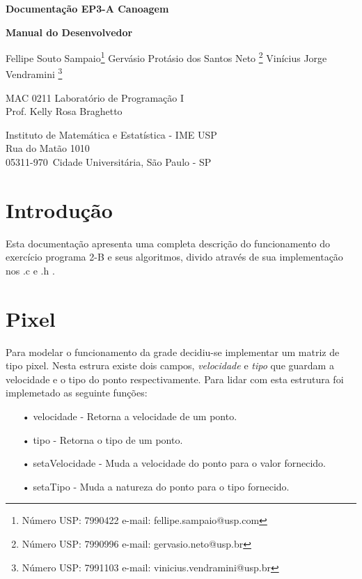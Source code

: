 \documentclass[a4paper,11pt]{article}
\begin{document}
\begin{center}{\Large \bf Documenta\c{c}ão EP3-A Canoagem \\ }\end{center}
\begin{center}{\Large \bf Manual do Desenvolvedor\\ }\end{center}

\begin{center}
{
Fellipe Souto Sampaio\footnote{Número USP: 7990422 e-mail: fellipe.sampaio@usp.com}
Gervásio Protásio dos Santos Neto \footnote{Número USP: 7990996 e-mail: gervasio.neto@usp.br}
Vinícius Jorge Vendramini \footnote{Número USP: 7991103 e-mail: vinicius.vendramini@usp.br}
}

\end{center}

\begin{center}
MAC 0211 Laboratório de Programa\c{c}ão I \\
Prof. Kelly Rosa Braghetto \\
             
\end{center}

\begin{center}
Instituto de Matemática e Estatística - IME USP \\
 Rua do Matão 1010 \\
 05311-970\, Cidade Universitária, São Paulo - SP \\
\end{center}

\newpage

\section{Introdu\c{c}ão}
Esta documenta\c{c}ão apresenta uma completa descri\c{c}ão do funcionamento do exercício programa 2-B e seus algoritmos, divido através de sua implementa\c{c}ão nos .c e .h .

\section{Pixel}
Para modelar o funcionamento da grade decidiu-se implementar um matriz de tipo pixel. Nesta estrura existe dois campos, \textit{velocidade} e \textit{tipo} que guardam a velocidade e o tipo do ponto respectivamente. Para lidar com esta estrutura foi implemetado as seguinte fun\c{c}ões:
\begin{enumerate}
\item[•]{velocidade - Retorna a velocidade de um ponto.}
\item[•]{tipo - Retorna o tipo de um ponto.} 
\item[•]{setaVelocidade - Muda a velocidade do ponto para o valor fornecido.} 
\item[•]{setaTipo - Muda a natureza do ponto para o tipo fornecido.} 

\end{enumerate}
\end{document}
